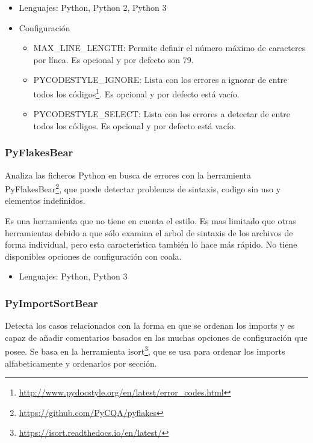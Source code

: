 \documentclass[a4paper, 12pt]{book}
\begin{document}
\begin{itemize}
  \item Lenguajes: Python, Python 2, Python 3
  \item Configuración
    \begin{itemize}
          \item MAX\_LINE\_LENGTH: Permite definir el número máximo de caracteres por línea. Es opcional y por defecto son 79.
          \item PYCODESTYLE\_IGNORE: Lista con los errores a ignorar de entre todos los códigos\footnote{\url{http://www.pydocstyle.org/en/latest/error_codes.html}}. Es opcional y por defecto está vacío.
          \item PYCODESTYLE\_SELECT: Lista con los errores a detectar de entre todos los códigos. Es opcional y por defecto está vacío.
    \end{itemize}
\end{itemize}

\subsubsection{PyFlakesBear}
\label{sec:seccion1.2.8}
Analiza las ficheros Python en busca de errores con la herramienta PyFlakesBear\footnote{\url{https://github.com/PyCQA/pyflakes}}, que puede detectar problemas de sintaxis, codigo sin uso y elementos indefinidos.

Es una herramienta que no tiene en cuenta el estilo. Es mas limitado que otras herramientas debido a que sólo examina el arbol de sintaxis de los archivos de forma individual, pero esta característica también lo hace más rápido. No tiene disponibles opciones de configuración con coala.

\begin{itemize}
  \item Lenguajes: Python, Python 3
\end{itemize}

\subsubsection{PyImportSortBear}
\label{sec:seccion1.2.9}
Detecta los casos relacionados con la forma en que se ordenan los imports y es capaz de añadir comentarios basados en las muchas opciones de configuración que posee. Se basa en la herramienta isort\footnote{\url{https://isort.readthedocs.io/en/latest/}}, que se usa para ordenar los imports alfabeticamente y ordenarlos por sección.
\end{document}
